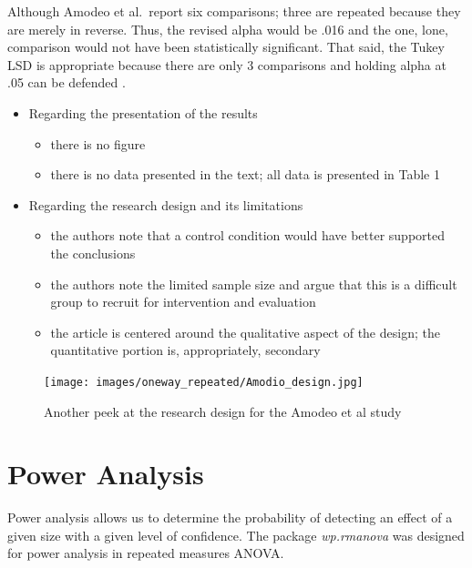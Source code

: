 \documentclass[
  11pt,
]{book}
\providecommand{\tightlist}{%
  \setlength{\itemsep}{0pt}\setlength{\parskip}{0pt}}
\begin{document}
Although Amodeo et al.~report six comparisons; three are repeated because they are merely in reverse. Thus, the revised alpha would be .016 and the one, lone, comparison would not have been statistically significant. That said, the Tukey LSD is appropriate because there are only 3 comparisons and holding alpha at .05 can be defended \citep{green_using_2017}.

\begin{itemize}
\tightlist
\item
  Regarding the presentation of the results

  \begin{itemize}
  \tightlist
  \item
    there is no figure
  \item
    there is no data presented in the text; all data is presented in Table 1
  \end{itemize}
\item
  Regarding the research design and its limitations

  \begin{itemize}
  \tightlist
  \item
    the authors note that a control condition would have better supported the conclusions
  \item
    the authors note the limited sample size and argue that this is a difficult group to recruit for intervention and evaluation
  \item
    the article is centered around the qualitative aspect of the design; the quantitative portion is, appropriately, secondary
  \end{itemize}
\end{itemize}

\begin{figure}
\hypertarget{id}{%
\centering
\texttt{[image: images/oneway\_repeated/Amodio\_design.jpg]}
\caption{Another peek at the research design for the Amodeo et al study}\label{id}
}
\end{figure}

\hypertarget{power-analysis-2}{%
\section{Power Analysis}\label{power-analysis-2}}

Power analysis allows us to determine the probability of detecting an effect of a given size with a given level of confidence. The package \emph{wp.rmanova} was designed for power analysis in repeated measures ANOVA.
\end{document}
